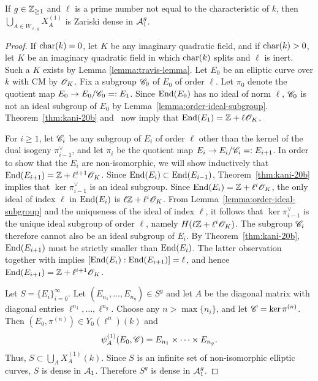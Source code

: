 \documentclass{amsart}
\begin{document}
\begin{theorem}\label{thm:curves-dense-a1}
    If $g \in \mathbb{Z}_{\ge 1}$ and $\ell$ is a
    prime number not equal to the characteristic of $k$, %
    then $\bigcup_{A\in W_{\ell,g}} X^{(1)}_A$ is Zariski dense in $\mathcal{A}_1^g$.
\end{theorem}
\begin{proof}
 If $\operatorname{char}(k)=0$, let $K$ be any imaginary quadratic field, and if $\operatorname{char}(k)> 0$, let
  $K$ be an imaginary quadratic field in which $\operatorname{char}(k)$ splits and $\ell$ is inert.
  Such a $K$ exists by Lemma \ref{lemma:travis-lemma}.
 Let $E_0$ be an elliptic curve over $k$ with CM by $\mathscr{O}_K$.
 Fix a subgroup $\mathscr{C}_0$ of $E_0$ of order $\ell$. Let $\pi_0$ denote the quotient map $E_0 \to E_0/\mathscr{C}_0 =: E_1$. Since $\operatorname{End}(E_0)$ has no ideal of norm $\ell$, $\mathscr{C}_0$ is not an  ideal subgroup of $E_0$ by Lemma~\ref{lemma:order-ideal-subgroup}. Theorem~\ref{thm:kani-20b} and~\cite[Prop.~5]{kohel1996endomorphism} now imply that $\operatorname{End}(E_1) = \mathbb{Z} + \ell\mathscr{O}_K$.

 For $i \ge 1$, let $\mathscr{C}_i$ be any subgroup of $E_i$ of order $\ell$ other than the kernel of the dual isogeny $\pi_{i-1}^\vee$, and let $\pi_i$ be the quotient map $E_i \to E_i/\mathscr{C}_i =: E_{i+1}$. In order to show that the $E_i$ are non-isomorphic, we will show inductively that $\operatorname{End}(E_{i+1}) = \mathbb{Z} + \ell^{i+1}\mathscr{O}_{K}$. Since $\operatorname{End}(E_{i}) \subset \operatorname{End}(E_{i-1})$, Theorem~\ref{thm:kani-20b} implies that $\ker \pi_{i-1}^\vee$ is an ideal subgroup. Since $\operatorname{End}(E_{i}) = \mathbb{Z} + \ell^{i}\mathscr{O}_{K}$, the only ideal of index $\ell$ in $\operatorname{End}(E_{i})$ is $\ell\mathbb{Z} + \ell^i\mathscr{O}_K$. From Lemma~\ref{lemma:order-ideal-subgroup} and the uniqueness of the ideal of index $\ell$, it follows that $\ker \pi_{i-1}^\vee$ is the unique ideal subgroup of order $\ell$, namely $H(\ell\mathbb{Z} + \ell^i\mathscr{O}_K)$. The subgroup $\mathscr{C}_i$ therefore cannot also be an ideal subgroup of $E_i$. By Theorem~\ref{thm:kani-20b}, $\operatorname{End}(E_{i+1})$ must be strictly smaller than $\operatorname{End}(E_{i})$. The latter observation together with \cite[Prop.~5]{kohel1996endomorphism} implies $[\operatorname{End}(E_i):\operatorname{End}(E_{i+1})] = \ell$, and hence $\operatorname{End}(E_{i+1}) = \mathbb{Z} + \ell^{i+1}\mathscr{O}_{K}$.

  Let $S = \{E_i\}_{i=0}^\infty$. Let $(E_{n_1},\dots,E_{n_g}) \in S^g$ and let $A$ be the diagonal matrix with diagonal entries $\ell^{n_1},\dots,\ell^{n_g}$.  Choose any $n > \max\{n_i\}$, and let $\mathscr{C} = \ker \pi^{(n)}$. Then $(E_0,\pi^{(n)}) \in Y_0(\ell^n)(k)$ and
 \[
   \psi_{A}^{(1)}(E_0,\mathscr{C}) = E_{n_1} \times \cdots \times E_{n_g}.
 \]
Thus, $S \subset \bigcup_A X^{(1)}_A(k)$. Since $S$ is an infinite set of non-isomorphic elliptic curves, $S$ is dense in $\mathcal{A}_1$. Therefore $S^g$ is dense in $\mathcal{A}_1^g$.
\end{proof}
\end{document}
